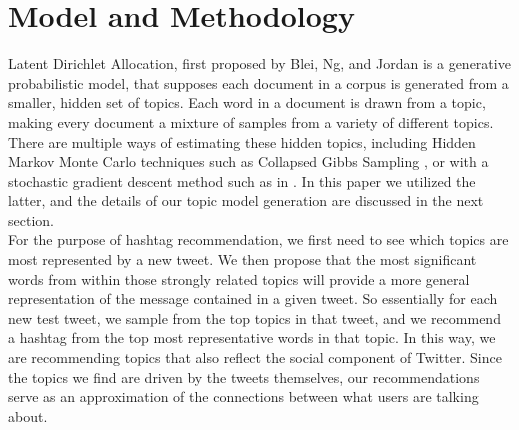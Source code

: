 \documentclass{acm_proc_article-sp}
\begin{document}
\section{Model and Methodology}
\hspace*{5mm}Latent Dirichlet Allocation, first proposed by Blei, Ng, and Jordan \cite{blei2003latent} is a generative probabilistic model, that supposes each document in a corpus is generated from a smaller, hidden set of topics. Each word in a document is drawn from a topic, making every document a mixture of samples from a variety of different topics. There are multiple ways of estimating these hidden topics, including Hidden Markov Monte Carlo techniques such as Collapsed Gibbs Sampling \cite{griffiths2002gibbs}, or with a stochastic gradient descent method such as in \cite{hoffman2010online}. In this paper we utilized the latter, and the details of our topic model generation are discussed in the next section.\\
\hspace*{5mm}For the purpose of hashtag recommendation, we first need to see which topics are most represented by a new tweet. We then propose that the most significant words from within those  strongly related topics will provide a more general representation of the message contained in a given tweet. So essentially for each new test tweet, we sample from the top topics in that tweet, and we recommend a hashtag from the top most representative words in that topic. In this way, we are recommending topics that also reflect the social component of Twitter. Since the topics we find are driven by the tweets themselves, our recommendations serve as an approximation of the connections between what users are talking about.\\
\end{document}
